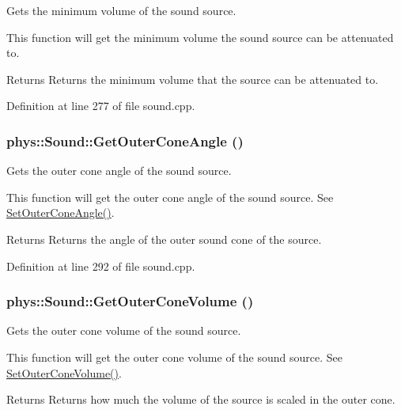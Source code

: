 Gets the minimum volume of the sound source. 

This function will get the minimum volume the sound source can be attenuated to. \begin{DoxyReturn}{Returns}
Returns the minimum volume that the source can be attenuated to. 
\end{DoxyReturn}


Definition at line 277 of file sound.cpp.

\hypertarget{classphys_1_1Sound_ad39ca4504655a777283fd2e238b729d1}{
\subsubsection[{GetOuterConeAngle}]{ phys::Sound::GetOuterConeAngle ()}}
\label{dc/d2f/classphys_1_1Sound_ad39ca4504655a777283fd2e238b729d1}


Gets the outer cone angle of the sound source. 

This function will get the outer cone angle of the sound source. See \hyperlink{classphys_1_1Sound_a4fc7d07d303ddb97acc15524950d0442}{SetOuterConeAngle()}. \begin{DoxyReturn}{Returns}
Returns the angle of the outer sound cone of the source. 
\end{DoxyReturn}


Definition at line 292 of file sound.cpp.

\hypertarget{classphys_1_1Sound_a2607037d0c40d32f402d0ebb98586a00}{
\subsubsection[{GetOuterConeVolume}]{ phys::Sound::GetOuterConeVolume ()}}
\label{dc/d2f/classphys_1_1Sound_a2607037d0c40d32f402d0ebb98586a00}


Gets the outer cone volume of the sound source. 

This function will get the outer cone volume of the sound source. See \hyperlink{classphys_1_1Sound_a55b0eadd492fc1a5fbae9848f5682ac9}{SetOuterConeVolume()}. \begin{DoxyReturn}{Returns}
Returns how much the volume of the source is scaled in the outer cone. 
\end{DoxyReturn}


